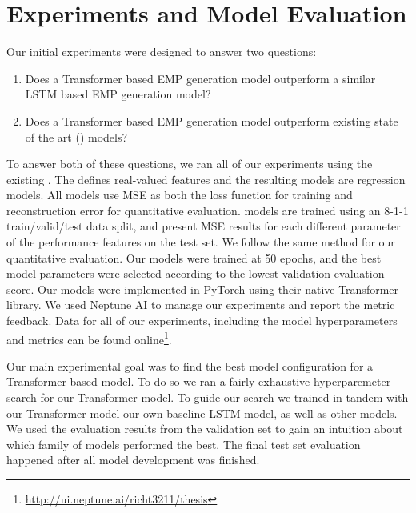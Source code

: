 \section{Experiments and Model Evaluation}\label{sec:experiments-and-evaluation}
Our initial experiments were designed to answer two questions: 
\begin{enumerate}
    \item Does a Transformer based EMP generation model outperform a similar LSTM based EMP generation model?
    \item Does a Transformer based EMP generation model outperform existing state of the art (\vnet{}) models?
\end{enumerate}
To answer both of these questions, we ran all of our experiments using the existing \vnetf{}. The \vnetf{} defines real-valued features and the resulting models are regression models. All \vnet{} models use MSE as both the loss function for training and reconstruction error for quantitative evaluation. \vnet{} models are trained using an 8-1-1 train/valid/test data split, and \citet{jeong2019virtuosonet} present MSE results for each different parameter of the performance features on the test set. We follow the same method for our quantitative evaluation. Our models were trained at 50 epochs, and the best model parameters were selected according to the lowest validation evaluation score. Our models were implemented in PyTorch using their native Transformer library. We used Neptune AI \cite{neptune} to manage our experiments and report the metric feedback. Data for all of our experiments, including the model hyperparameters and metrics can be found online\footnote{\url{http://ui.neptune.ai/richt3211/thesis}}. 

Our main experimental goal was to find the best model configuration for a Transformer based model. To do so we ran a fairly exhaustive hyperparemeter search for our Transformer model. To guide our search we trained in tandem with our Transformer model our own baseline LSTM model, as well as other \vnet{} models. We used the evaluation results from the validation set to gain an intuition about which family of models performed the best. The final test set evaluation happened after all model development was finished. 


